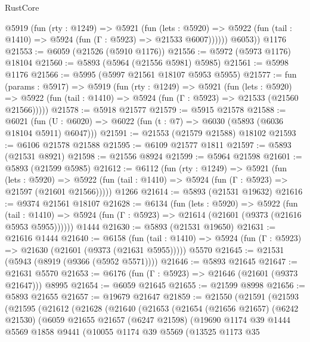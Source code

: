 \begin{lexlean}{RustCore}
\begin{coremodule}
          @5919
            (fun (rty : @1249) =>
            @5921
              (fun (lets : @5920) =>
              @5922 (fun (tail : @1410) => @5924 (fun (Γ : @5923) => @21533 @6007))))))
        @6053))
    @1176
@21553 := @6059 (@21526 (@5910 @1176))
@21556 := @5972 (@5973 @1176) @18104
@21560 := @5893 (@5964 (@21556 @5981) @5985)
@21561 := @5998 @1176
@21566 := @5995 (@5997 @21561 @18107 @5953 @5955)
@21577 := fun (params : @5917) =>
  @5919
    (fun (rty : @1249) =>
    @5921
      (fun (lets : @5920) =>
      @5922 (fun (tail : @1410) => @5924 (fun (Γ : @5923) => @21533 (@21560 @21566)))))
@21578 := @5918 @21577
@21579 := @5915 @21578
@21588 := @6021
    (fun (U : @6020) => @6022 (fun (t : @7) => @6030 (@5893 (@6036 @18104 @5911) @6047)))
@21591 := @21553 (@21579 @21588) @18102
@21593 := @6106 @21578 @21588
@21595 := @6109 @21577 @1811
@21597 := @5893 (@21531 @8921)
@21598 := @21556 @8924
@21599 := @5964 @21598
@21601 := @5893 (@21599 @5985)
@21612 := @6112
    (fun (rty : @1249) =>
    @5921
      (fun (lets : @5920) =>
      @5922 (fun (tail : @1410) => @5924 (fun (Γ : @5923) => @21597 (@21601 @21566)))))
    @1266
@21614 := @5893 (@21531 @19632)
@21616 := @9374 @21561 @18107
@21628 := @6134
    (fun (lets : @5920) =>
    @5922
      (fun (tail : @1410) =>
      @5924 (fun (Γ : @5923) => @21614 (@21601 (@9373 (@21616 @5953 @5955))))))
    @1444
@21630 := @5893 (@21531 @19650)
@21631 := @21616 @1444
@21640 := @6158
    (fun (tail : @1410) => @5924 (fun (Γ : @5923) => @21630 (@21601 (@9373 (@21631 @5955)))))
    @5570
@21645 := @21531 (@5943 (@8919 (@9366 (@5952 @5571))))
@21646 := @5893 @21645
@21647 := @21631 @5570
@21653 := @6176 (fun (Γ : @5923) => @21646 (@21601 (@9373 @21647))) @8995
@21654 := @6059 @21645
@21655 := @21599 @8998
@21656 := @5893 @21655
@21657 := @19679 @21647
@21859 := @21550
    (@21591
      (@21593
        (@21595
          (@21612
            (@21628
              (@21640
                (@21653
                  (@21654
                    (@21656 @21657)
                    (@6242 @21530)
                    (@6059
                      @21655
                      @21657
                      (@6247 @21598)
                      (@19690
                        @1174
                        @39
                        @1444
                        @5569
                        @1858
                        @9441
                        (@10055
                          @1174
                          @39
                          @5569
                          (@13525
                            @1173
                            @35

\end{coremodule}
\end{lexlean}
